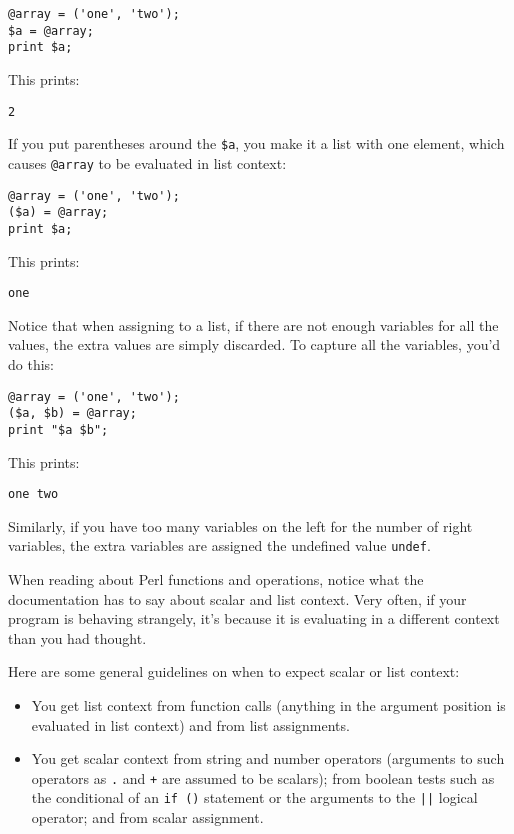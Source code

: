 \begin{lstlisting}
@array = ('one', 'two');
$a = @array;
print $a;
\end{lstlisting}

This prints:

\begin{lstlisting}
2
\end{lstlisting}

If you put parentheses around the \verb|$a|, you make it a list with one element, which causes \verb|@array| to be evaluated in list context:

\begin{lstlisting}
@array = ('one', 'two');
($a) = @array;
print $a;
\end{lstlisting}

This prints:

\begin{lstlisting}
one
\end{lstlisting}

Notice that when assigning to a list, if there are not enough variables for all the values, the extra values are simply discarded. To capture all the variables, you'd do this:

\begin{lstlisting}
@array = ('one', 'two');
($a, $b) = @array;
print "$a $b";
\end{lstlisting}

This prints:

\begin{lstlisting}
one two
\end{lstlisting}

Similarly, if you have too many variables on the left for the number of right variables, the extra variables are assigned the undefined value \verb|undef|.

When reading about Perl functions and operations, notice what the documentation has to say about scalar and list context. Very often, if your program is behaving strangely, it's because it is evaluating in a different context than you had thought.

Here are some general guidelines on when to expect scalar or list context:

\begin{itemize}
  \item You get list context from function calls (anything in the argument position is evaluated in list context) and from list assignments. 
  \item You get scalar context from string and number operators (arguments to such operators as \verb|.| and \verb|+| are assumed to be scalars); from boolean tests such as the conditional of an \verb|if ()| statement or the arguments to the \verb=||= logical operator; and from scalar assignment.
\end{itemize}

